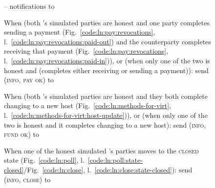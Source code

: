 \begin{figure}[H]
\begin{simulatorbox}{\simulator{} -- notifications to \fchan}
\begin{algorithmic}[1]
      \State When (both \fchan's simulated parties are honest and one party
      completes sending a payment (Fig.~\ref{code:ln:pay:revocations},
      l.~\ref{code:ln:pay:revocations:paid-out}) and the counterparty completes
      receiving that payment (Fig.~\ref{code:ln:pay:revocations},
      l.~\ref{code:ln:pay:revocations:paid-in})), or (when only one of the two
      is honest and (completes either receiving or sending a payment)):
      \Indent
        \State send (\textsc{info}, \textsc{pay ok}) to \fchan
      \EndIndent
      \Statex

      \State When (both \fchan's simulated parties are honest and they both
      complete changing to a new host (Fig.~\ref{code:ln:methods-for-virt},
      l.~\ref{code:ln:methods-for-virt:host-update})), or (when only one of the
      two is honest and it completes changing to a new host): 
      \Indent
        \State send (\textsc{info}, \textsc{fund ok}) to \fchan
      \EndIndent
      \Statex

      \State When one of the honest simulated \fchan's parties moves to the
      \textsc{closed} state (Fig.~\ref{code:ln:poll},
      l.~\ref{code:ln:poll:state-closed}/Fig.~\ref{code:ln:close},
      l.~\ref{code:ln:close:state-closed}):
      \Indent
        \State send (\textsc{info}, \textsc{close}) to \fchan
      \EndIndent
    \end{algorithmic}
  \end{simulatorbox}
  \caption{}
  \label{code:simulator}
\end{figure}
